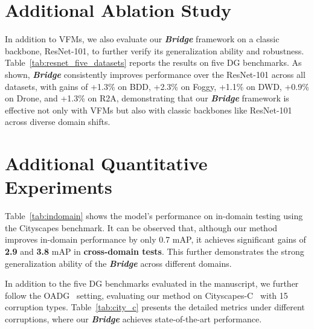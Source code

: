 \documentclass[10pt,twocolumn,letterpaper]{article}
\theoremstyle{plain}
\theoremstyle{definition}
\theoremstyle{remark}
\begin{document}
\section{Additional Ablation Study}


In addition to VFMs, we also evaluate our \textbf{\textit{Bridge}} framework on a classic backbone, ResNet-101, to further verify its generalization ability and robustness. Table~\ref{tab:resnet_five_datasets} reports the results on five DG benchmarks. As shown, \textbf{\textit{Bridge}} consistently improves performance over the ResNet-101 across all datasets, with gains of +1.3\% on BDD, +2.3\% on Foggy, +1.1\% on DWD, +0.9\% on Drone, and +1.3\% on R2A, demonstrating that our \textbf{\textit{Bridge}} framework is effective not only with VFMs but also with classic backbones like ResNet-101 across diverse domain shifts.


\section{Additional Quantitative Experiments}

Table~\ref{tab:indomain} shows the model’s performance on in-domain testing using the Cityscapes benchmark. It can be observed that, although our method improves in-domain performance by only 0.7 mAP, it achieves significant gains of \textbf{2.9} and \textbf{3.8} mAP in \textbf{cross-domain tests}. This further demonstrates the strong generalization ability of the \textbf{\textit{Bridge}} across different domains.

In addition to the five DG benchmarks evaluated in the manuscript, we further follow the OADG~\cite{lee2024object} setting, evaluating our method on Cityscapes-C~\cite{michaelis2019benchmarking} with 15 corruption types. Table~\ref{tab:city_c} presents the detailed metrics under different corruptions, where our \textbf{\textit{Bridge}} achieves state-of-the-art performance.





\end{document}
